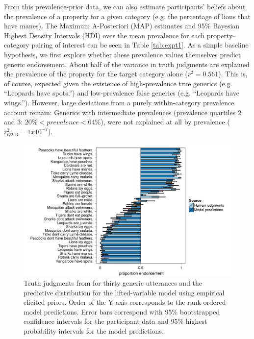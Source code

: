 \documentclass[10pt,letterpaper]{article}
\begin{document}
From this prevalence-prior data, we can also estimate participants' beliefs about the prevalence of a property for a given category (e.g. the percentage of lions that have manes). The Maximum A-Posteriori (MAP) estimates and 95\% Bayesian Highest Density Intervals (HDI) over the mean prevalence for each property--category pairing of interest can be seen in Table \ref{tab:expt1}. 
As a simple baseline hypothesis, we first explore whether these prevalence values themselves predict generic endorsement.
About half of the variance in truth judgments are explained the prevalence of the property for the target category alone ($r^2 = 0.561$). 
This is, of course, expected given the existence of high-prevalence true generics (e.g. ``Leopards have spots.'') and low-prevalence false generics (e.g. ``Leopards have wings.''). 
However, large deviations from a purely within-category prevalence account remain: Generics with intermediate prevalences (prevalence quartiles 2 and 3: $ 20\% < prevalence < 64\%$), were not explained at all by prevalence ($r_{Q2,3}^2 = 1 x 10^{-7}$).

\begin{figure}
\centering
    \includegraphics[width=\columnwidth]{tj_n100-postPred-byItem.pdf}
    \caption{Truth judgments from for thirty generic utterances and the predictive distribution for the lifted-variable model using empirical elicited priors. Order of the Y-axis corresponds to the rank-ordered model predictions. Error bars correspond with 95\% bootstrapped confidence intervals for the participant data and 95\% highest probability intervals for the model predictions.}
  \label{fig:modeldataBars}
\end{figure}
\end{document}
